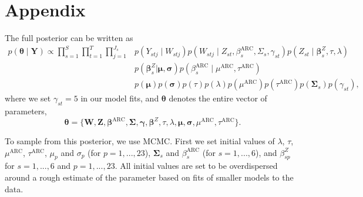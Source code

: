 \documentclass[12pt]{article}
\def\bbeta{\pmb{\beta}}
\def\bgamma{\pmb{\gamma}}
\def\bmu{\pmb{\mu}}
\def\bsigma{\pmb{\sigma}}
\def\bSigma{\pmb{\Sigma}}
\def\btheta{\pmb{\theta}}
\def\bY{\pmb{Y}}
\def\bZ{\pmb{Z}}
\def\bW{\pmb{W}}
\begin{document}
\newpage
\small\normalsize
%




\newpage
\section{Appendix}

The full posterior can be written as
\begin{align*}
p(\btheta \mid \bY) \propto \prod_{s = 1}^S \prod_{t = 1}^T \prod_{j = 1}^{J_s} & p(Y_{stj} \mid W_{stj}) p(W_{stj} \mid Z_{st}, \beta_s^\text{ARC}, \Sigma_s, \gamma_{st}) p(Z_{st} \mid \bbeta_s^Z, \tau, \lambda) \\
& p(\bbeta_s^Z | \bmu, \bsigma) p(\beta_s^\text{ARC} \mid \mu^\text{ARC}, \tau^\text{ARC}) \\
& p(\bmu) p(\bsigma) p(\tau) p(\lambda) p(\mu^\text{ARC}) p(\tau^\text{ARC}) p(\bSigma_s) p(\gamma_{st}),
\end{align*}
where we set $\gamma_{st} = 5$ in our model fits, and $\btheta$ denotes the entire vector of parameters, 
$$
\btheta = \{\bW, \bZ, \bbeta^\text{ARC}, \bSigma, \bgamma, \bbeta^Z, \tau, \lambda, \bmu, \bsigma, \mu^\text{ARC}, \tau^\text{ARC}\}.
$$

To sample from this posterior, we use MCMC. First we set initial values of $\lambda$, $\tau$, $\mu^\text{ARC}$, $\tau^\text{ARC}$, $\mu_p$ and $\sigma_p$ (for $p = 1, ..., 23$), $\bSigma_s$ and $\beta_s^\text{ARC}$ (for $s = 1, ..., 6$), and $\beta^Z_{sp}$ for $s = 1, ..., 6$ and $p = 1, ..., 23$. All initial values are set to be overdispersed around a rough estimate of the parameter based on fits of smaller models to the data.
\end{document}
